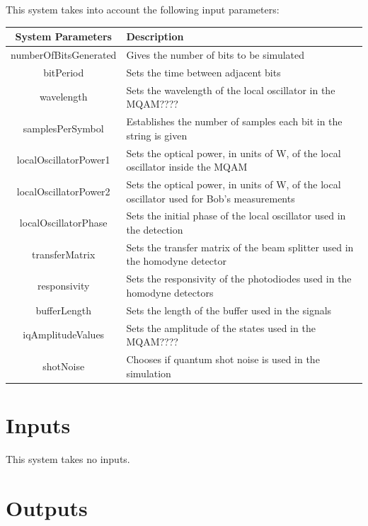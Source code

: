\documentclass[a4paper]{article}
\begin{document}
This system takes into account the following input parameters:
\begin{table}[H]
\centering
\begin{tabulary}{1.0\textwidth}{|C|L|}
\hline
\textbf{System Parameters} & \textbf{Description}\\
\hline
numberOfBitsGenerated   & Gives the number of bits to be simulated\\
\hline  
bitPeriod               & Sets the time between adjacent bits\\
\hline 
wavelength              & Sets the wavelength of the local oscillator in the MQAM????\\
\hline 
samplesPerSymbol        & Establishes the number of samples each bit in the string is given\\ 
\hline
localOscillatorPower1   & Sets the optical power, in units of W, of the local oscillator inside the MQAM\\
\hline  
localOscillatorPower2   & Sets the optical power, in units of W, of the local oscillator used for Bob's measurements\\
\hline  
localOscillatorPhase    & Sets the initial phase of the local oscillator used in the detection\\
\hline  
transferMatrix          & Sets the transfer matrix of the beam splitter used in the homodyne detector\\ 
\hline  
responsivity            & Sets the responsivity of the photodiodes used in the homodyne detectors\\ 
\hline  
bufferLength            & Sets the length of the buffer used in the signals\\
\hline  
iqAmplitudeValues       & Sets the amplitude of the states used in the MQAM????\\
\hline
shotNoise               & Chooses if quantum shot noise is used in the simulation\\
\hline
\end{tabulary}
\end{table}		

\section{Inputs}

This system takes no inputs.

\pagebreak
\section{Outputs}
\end{document}
